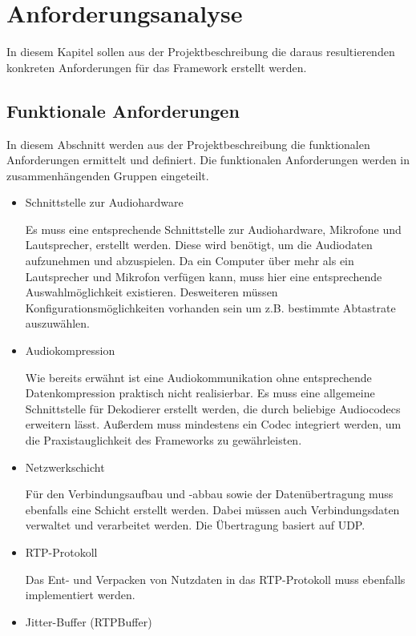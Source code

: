 \chapter{Anforderungsanalyse}
In diesem Kapitel sollen aus der Projektbeschreibung die daraus resultierenden konkreten Anforderungen für das Framework erstellt werden. 

\section{Funktionale Anforderungen}
	In diesem Abschnitt werden aus der Projektbeschreibung die funktionalen Anforderungen ermittelt und definiert. Die funktionalen Anforderungen werden in zusammenhängenden Gruppen eingeteilt.

	\begin{itemize} 
		\item Schnittstelle zur Audiohardware

		Es muss eine entsprechende Schnittstelle zur Audiohardware, Mikrofone und Lautsprecher, erstellt werden. Diese wird benötigt, um die Audiodaten aufzunehmen und abzuspielen. Da ein Computer über mehr als ein Lautsprecher und Mikrofon verfügen kann, muss hier eine entsprechende Auswahlmöglichkeit existieren. Desweiteren müssen Konfigurationsmöglichkeiten vorhanden sein um z.B. bestimmte Abtastrate auszuwählen.
			
		\item Audiokompression

		Wie bereits erwähnt ist eine Audiokommunikation ohne entsprechende Datenkompression praktisch nicht realisierbar. Es muss eine allgemeine Schnittstelle für Dekodierer erstellt werden, die durch beliebige Audiocodecs erweitern lässt. Außerdem muss mindestens ein Codec integriert werden, um die Praxistauglichkeit des Frameworks zu gewährleisten.
			\pagebreak
		\item Netzwerkschicht

		Für den Verbindungsaufbau und -abbau sowie der Datenübertragung muss ebenfalls eine Schicht erstellt werden. Dabei müssen auch Verbindungsdaten verwaltet und verarbeitet werden. Die Übertragung basiert auf UDP.
				
		\item RTP-Protokoll

		Das Ent- und Verpacken von Nutzdaten in das RTP-Protokoll muss ebenfalls implementiert werden.
				
		\item Jitter-Buffer (RTPBuffer)


\end{itemize}
